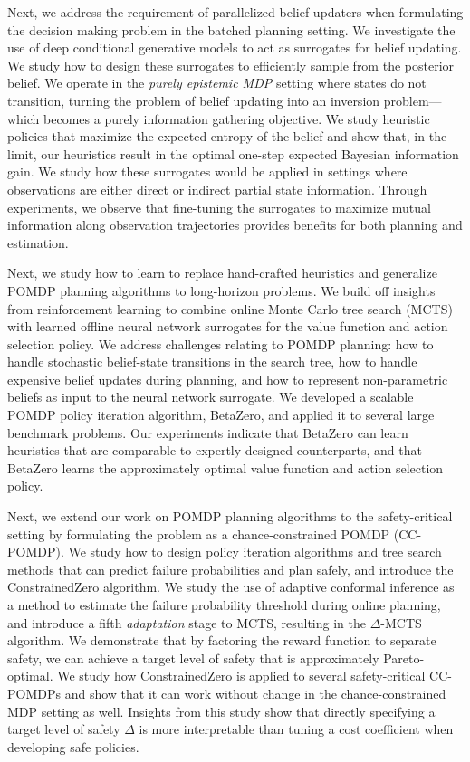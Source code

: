 Next, we address the requirement of parallelized belief updaters when formulating the decision making problem in the batched planning setting.
We investigate the use of deep conditional generative models to act as surrogates for belief updating.
We study how to design these surrogates to efficiently sample from the posterior belief.
We operate in the \textit{purely epistemic MDP} setting where states do not transition, turning the problem of belief updating into an inversion problem---which becomes a purely information gathering objective.
We study heuristic policies that maximize the expected entropy of the belief and show that, in the limit, our heuristics result in the optimal one-step expected Bayesian information gain.
We study how these surrogates would be applied in settings where observations are either direct or indirect partial state information.
Through experiments, we observe that fine-tuning the surrogates to maximize mutual information along observation trajectories provides benefits for both planning and estimation.


Next, we study how to learn to replace hand-crafted heuristics and generalize POMDP planning algorithms to long-horizon problems.
We build off insights from reinforcement learning to combine online Monte Carlo tree search (MCTS) with learned offline neural network surrogates for the value function and action selection policy.
We address challenges relating to POMDP planning: how to handle stochastic belief-state transitions in the search tree, how to handle expensive belief updates during planning, and how to represent non-parametric beliefs as input to the neural network surrogate.
We developed a scalable POMDP policy iteration algorithm, BetaZero, and applied it to several large benchmark problems.
Our experiments indicate that BetaZero can learn heuristics that are comparable to expertly designed counterparts, and that BetaZero learns the approximately optimal value function and action selection policy.


Next, we extend our work on POMDP planning algorithms to the safety-critical setting by formulating the problem as a  chance-constrained POMDP (CC-POMDP).
We study how to design policy iteration algorithms and tree search methods that can predict failure probabilities and plan safely, and introduce the ConstrainedZero algorithm.
We study the use of adaptive conformal inference as a method to estimate the failure probability threshold during online planning, and introduce a fifth \textit{adaptation} stage to MCTS, resulting in the $\Delta$-MCTS algorithm.
We demonstrate that by factoring the reward function to separate safety, we can achieve a target level of safety that is approximately Pareto-optimal.
We study how ConstrainedZero is applied to several safety-critical CC-POMDPs and show that it can work without change in the chance-constrained MDP setting as well.
Insights from this study show that directly specifying a target level of safety $\Delta$ is more interpretable than tuning a cost coefficient when developing safe policies.


